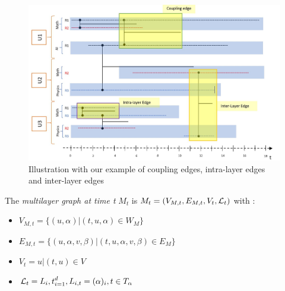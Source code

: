 \documentclass[dvipsnames,a4paper,11pt]{article}
\theoremstyle{definition}
\theoremstyle{remark}
\theoremstyle{remark}
\begin{document}
	\begin{figure}
		\centering
		\includegraphics[width=\textwidth]{schemas/edgesCat.jpg}
		\caption{Illustration with our example of coupling edges, intra-layer edges and inter-layer edges}
		\label{exIntraInter}
	\end{figure}
   	The {\em multilayer graph at time t} $M_t$ is $M_t = (V_{M,t}, E_{M,t},V_t,{\cal L}_t)$ with :
    \begin{itemize}
		\item $V_{M,t} = \{(u,\alpha)| (t,u,\alpha)\in W_M\}$
		\item $E_{M,t} = \{(u,\alpha,v,\beta) | (t,u,\alpha,v,\beta) \in E_M\}$
		\item $V_t = {u | (t,u) \in V}$
		\item ${\cal L}_t = {L_i,t}_{i=1}^d, L_{i,t}=(\alpha)_i, t\in T_\alpha$
    \end{itemize}
\end{document}
